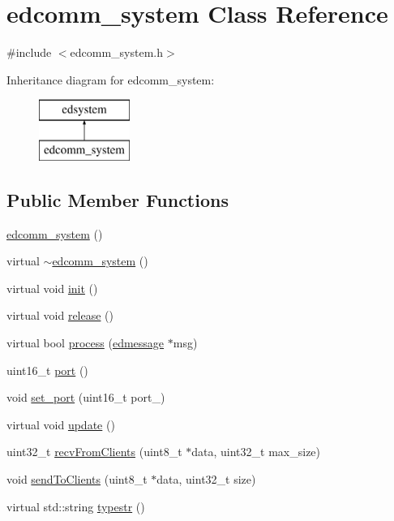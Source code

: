 \hypertarget{classedcomm__system}{\section{edcomm\-\_\-system Class Reference}
\label{classedcomm__system}
}


{\ttfamily \#include $<$edcomm\-\_\-system.\-h$>$}

Inheritance diagram for edcomm\-\_\-system\-:\begin{figure}[H]
\begin{center}
\leavevmode
\includegraphics[height=2.000000cm]{classedcomm__system}
\end{center}
\end{figure}
\subsection*{Public Member Functions}
\begin{DoxyCompactItemize}
\item 
\hyperlink{classedcomm__system_af0ff75511346286c460c8032f55b07ae}{edcomm\-\_\-system} ()
\item 
virtual \hyperlink{classedcomm__system_a15e21d845f4491cd2f8d82fb0924b580}{$\sim$edcomm\-\_\-system} ()
\item 
virtual void \hyperlink{classedcomm__system_a07f81f18aeca00b88928a8aec7b3129e}{init} ()
\item 
virtual void \hyperlink{classedcomm__system_ad9bdfd2845a3156f5d010e99f8fbed07}{release} ()
\item 
virtual bool \hyperlink{classedcomm__system_ad3b79f16dd77b5ae458cc360550e99cd}{process} (\hyperlink{structedmessage}{edmessage} $\ast$msg)
\item 
uint16\-\_\-t \hyperlink{classedcomm__system_ac7f39247c0f1ae2023adf9562dbc7c81}{port} ()
\item 
void \hyperlink{classedcomm__system_a36087648658a44860a8905d4b979c8fe}{set\-\_\-port} (uint16\-\_\-t port\-\_\-)
\item 
virtual void \hyperlink{classedcomm__system_adc9ffc8199070ad0d836a447005a4e1e}{update} ()
\item 
uint32\-\_\-t \hyperlink{classedcomm__system_ae9196f8b00b7e5d5a26075c4311b058c}{recv\-From\-Clients} (uint8\-\_\-t $\ast$data, uint32\-\_\-t max\-\_\-size)
\item 
void \hyperlink{classedcomm__system_a91aa83b31bc197b2f0ec1c5600f4ec9f}{send\-To\-Clients} (uint8\-\_\-t $\ast$data, uint32\-\_\-t size)
\item 
virtual std\-::string \hyperlink{classedcomm__system_a61e1243fba536c8263ba93367cd5a2a7}{typestr} ()
\end{DoxyCompactItemize}
